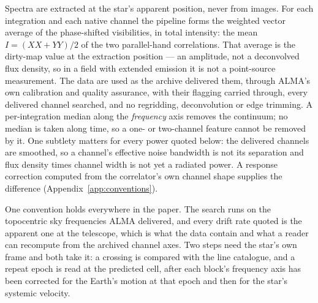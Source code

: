 Spectra are extracted at the star's apparent position, never from images.
For each integration and each native channel the pipeline forms the weighted
vector average of the phase-shifted visibilities, in total intensity: the
mean $I=(XX+YY)/2$ of the two parallel-hand correlations. That average is the
dirty-map value at the extraction position --- an amplitude, not a
deconvolved flux density, so in a field with extended emission it is not a
point-source measurement. The data are used as the archive delivered them,
through ALMA's own calibration and quality assurance, with their flagging
carried through, every delivered channel searched, and no regridding,
deconvolution or edge trimming. A per-integration median along the
\emph{frequency} axis removes the continuum; no median is taken along
time, so a one- or two-channel feature cannot be removed by it. One
subtlety matters for every power quoted below: the delivered channels are
smoothed, so a channel's effective noise bandwidth is not its separation
and flux density times channel width is not yet a radiated power. A
response correction computed from the correlator's own channel shape
supplies the difference (Appendix~\ref{app:conventions}).

One convention holds everywhere in the paper. The search runs on the
topocentric sky frequencies ALMA delivered, and every drift rate quoted is
the apparent one at the telescope, which is what the data contain and what
a reader can recompute from the archived channel axes. Two steps need the
star's own frame and both take it: a crossing is compared with the line
catalogue, and a repeat epoch is read at the predicted cell, after each
block's frequency axis has been corrected for the Earth's motion at that
epoch and then for the star's systemic velocity.

